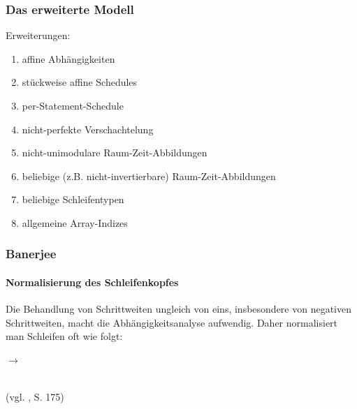 \subsubsection{Das erweiterte Modell}
\label{sec:new-mod}

Erweiterungen:
\begin{enumerate}
\item affine Abhängigkeiten\\[-7mm]
\item stückweise affine Schedules\\[-7mm]
\item per-Statement-Schedule\\[-7mm]
\item nicht-perfekte Verschachtelung\\[-7mm]
\item nicht-unimodulare Raum-Zeit-Abbildungen\\[-7mm]
\item beliebige (z.B. nicht-invertierbare) Raum-Zeit-Abbildungen\\[-7mm]
\item beliebige Schleifentypen\\[-7mm]
\item allgemeine Array-Indizes\\[-7mm]
\end{enumerate}


\subsubsection{Banerjee}

\paragraph{Normalisierung des Schleifenkopfes}

Die Behandlung von Schrittweiten ungleich von eins, insbesondere von
negativen Schrittweiten, macht die Abhängigkeitsanalyse aufwendig. Daher
normalisiert man Schleifen oft wie folgt:




\begin{minipage}{.4\textwidth}
  \begin{algorithm}[H]
  \end{algorithm}
\end{minipage}
\begin{minipage}{.5\textwidth}
    \qquad $\to$ \qquad
    \begin{algorithm}[H]
      \end{algorithm}
\end{minipage}
  ~\\
(vgl. \cite{Zima90}, S. 175)


